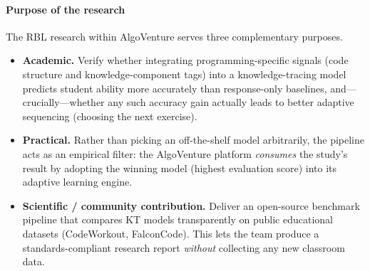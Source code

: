 \paragraph{Purpose of the research}
The RBL research within AlgoVenture serves three complementary purposes.
\begin{itemize}
  \item \textbf{Academic.} Verify whether integrating programming-specific
        signals (code structure and knowledge-component tags) into a
        knowledge-tracing model predicts student ability more accurately
        than response-only baselines, and---crucially---whether any such
        accuracy gain actually leads to better adaptive sequencing
        (choosing the next exercise).
  \item \textbf{Practical.} Rather than picking an off-the-shelf model
        arbitrarily, the pipeline acts as an empirical filter: the
        AlgoVenture platform \emph{consumes} the study's result by
        adopting the winning model (highest evaluation score) into its
        adaptive learning engine.
  \item \textbf{Scientific / community contribution.} Deliver an
        open-source benchmark pipeline that compares KT models
        transparently on public educational datasets (CodeWorkout,
        FalconCode). This lets the team produce a standards-compliant
        research report \emph{without} collecting any new classroom data.
\end{itemize}
